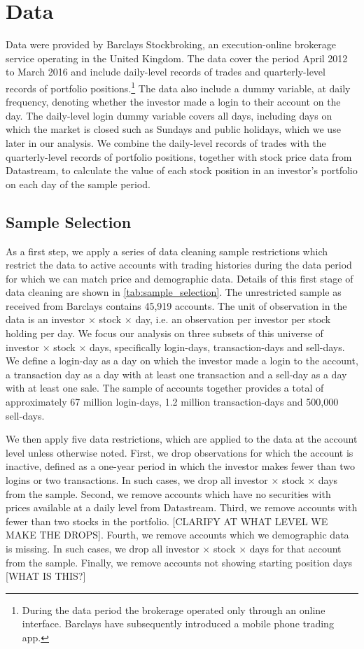 \section{Data}

Data were provided by Barclays Stockbroking, an execution-online brokerage service operating in the United Kingdom. The data cover the period April 2012 to March 2016 and include daily-level records of trades and quarterly-level records of portfolio positions.\footnote{During the data period the brokerage operated only through an online interface. Barclays have subsequently introduced a mobile phone trading app.} The data also include a dummy variable, at daily frequency, denoting whether the investor made a login to their account on the day. The daily-level login dummy variable covers all days, including days on which the market is closed such as Sundays and public holidays, which we use later in our analysis. We combine the daily-level records of trades with the quarterly-level records of portfolio positions, together with stock price data from Datastream, to calculate the value of each stock position in an investor's portfolio on each day of the sample period.

\subsection{Sample Selection}

As a first step, we apply a series of data cleaning sample restrictions which restrict the data to active accounts with trading histories during the data period for which we can match price and demographic data. Details of this first stage of data cleaning are shown in \ref{tab:sample_selection}. The unrestricted sample as received from Barclays contains 45,919 accounts. The unit of observation in the data is an investor $\times$ stock $\times$ day, i.e. an observation per investor per stock holding per day. We focus our analysis on three subsets of this universe of investor $\times$ stock $\times$ days, specifically login-days, transaction-days and sell-days. We define a login-day as a day on which the investor made a login to the account, a transaction day as a day with at least one transaction and a sell-day as a day with at least one sale. The sample of accounts together provides a total of approximately 67 million login-days, 1.2 million transaction-days and 500,000 sell-days.

We then apply five data restrictions, which are applied to the data at the account level unless otherwise noted. First, we drop observations for which the account is inactive, defined as a one-year period in which the investor makes fewer than two logins or two transactions. In such cases, we drop all investor $\times$ stock $\times$ days from the sample. Second, we remove accounts which have no securities with prices available at a daily level from Datastream. Third, we remove accounts with fewer than two stocks in the portfolio. [CLARIFY AT WHAT LEVEL WE MAKE THE DROPS]. Fourth, we remove accounts which we demographic data is missing. In such cases, we drop all investor $\times$ stock $\times$ days for that account from the sample. Finally, we remove accounts not showing starting position days [WHAT IS THIS?]

